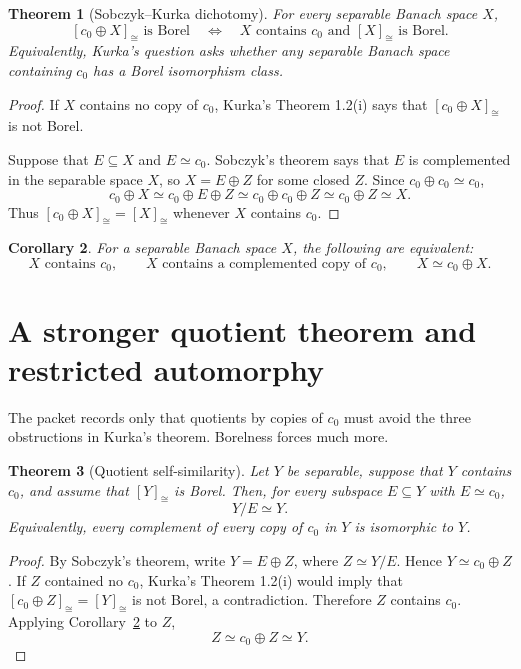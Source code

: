 \documentclass[11pt]{article}
\newtheorem{theorem}{Theorem}[section]
\newtheorem{corollary}[theorem]{Corollary}
\theoremstyle{definition}
\newcommand{\czer}{c_0}
\newcommand{\iso}{\simeq}
\newcommand{\class}[1]{[#1]_{\cong}}
\begin{document}
\begin{theorem}[Sobczyk--Kurka dichotomy]\label{thm:basic}
For every separable Banach space \(X\),
\[
 \class{\czer\oplus X}\text{ is Borel}
 \quad\Longleftrightarrow\quad
 X\text{ contains }\czer\text{ and }\class{X}\text{ is Borel}.
\]
Equivalently, Kurka's question asks whether any separable Banach space
containing \(\czer\) has a Borel isomorphism class.
\end{theorem}

\begin{proof}
If \(X\) contains no copy of \(\czer\), Kurka's Theorem 1.2(i) says that
\(\class{\czer\oplus X}\) is not Borel.

Suppose that \(E\subseteq X\) and \(E\iso\czer\).  Sobczyk's theorem says that
\(E\) is complemented in the separable space \(X\), so
\(X=E\oplus Z\) for some closed \(Z\).  Since
\(\czer\oplus\czer\iso\czer\),
\[
 \czer\oplus X
 \iso \czer\oplus E\oplus Z
 \iso \czer\oplus\czer\oplus Z
 \iso \czer\oplus Z
 \iso X.
\]
Thus \(\class{\czer\oplus X}=\class{X}\) whenever \(X\) contains \(\czer\).
\end{proof}

\begin{corollary}\label{cor:absorb}
For a separable Banach space \(X\), the following are equivalent:
\[
 X\text{ contains }\czer,
 \qquad X\text{ contains a complemented copy of }\czer,
 \qquad X\iso\czer\oplus X.
\]
\end{corollary}

\section{A stronger quotient theorem and restricted automorphy}

The packet records only that quotients by copies of \(\czer\) must avoid the
three obstructions in Kurka's theorem.  Borelness forces much more.

\begin{theorem}[Quotient self-similarity]\label{thm:quotient}
Let \(Y\) be separable, suppose that \(Y\) contains \(\czer\), and assume that
\(\class{Y}\) is Borel.  Then, for every subspace \(E\subseteq Y\) with
\(E\iso\czer\),
\[
                   Y/E\iso Y.
\]
Equivalently, every complement of every copy of \(\czer\) in \(Y\) is
isomorphic to \(Y\).
\end{theorem}

\begin{proof}
By Sobczyk's theorem, write \(Y=E\oplus Z\), where \(Z\iso Y/E\).  Hence
\(Y\iso\czer\oplus Z\).  If \(Z\) contained no \(\czer\), Kurka's Theorem
1.2(i) would imply that \(\class{\czer\oplus Z}=\class{Y}\) is not Borel, a
contradiction.  Therefore \(Z\) contains \(\czer\).  Applying
Corollary~\ref{cor:absorb} to \(Z\),
\[
       Z\iso\czer\oplus Z\iso Y.
\]
\end{proof}
\end{document}
